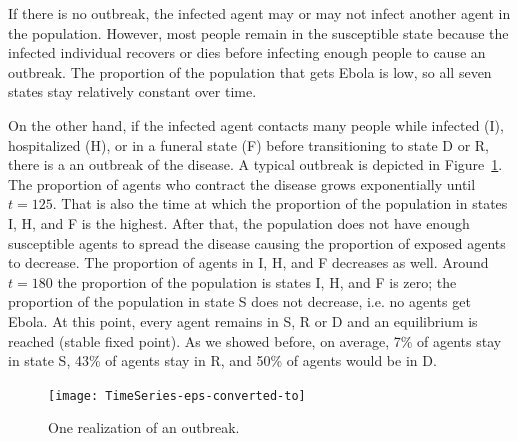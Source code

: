 
If there is no outbreak, the infected agent may or may not infect another agent in the population. However, most people remain in the  susceptible state because the infected individual recovers or dies before infecting enough people to cause an outbreak. The proportion of the population that gets Ebola is low, so all seven states stay relatively constant over time. %


On the other hand, if the infected agent contacts many people while infected (I), hospitalized (H), or in a funeral state (F) before transitioning to state D or R, there is a an outbreak of the disease. A typical outbreak is depicted in Figure~\ref{fig:Outbreak}. The proportion of agents who contract the disease grows exponentially until $t = 125$. That is also the time at which the proportion of the population in states I, H, and F is the highest. After that, the population does not have enough susceptible agents to spread the disease causing the proportion of exposed agents to decrease. The proportion of agents in I, H, and F decreases as well. Around $t = 180$ the proportion of the population is states I, H, and F is zero; the proportion of the population in state S does not decrease, i.e. no agents get Ebola. At this point, every agent remains in S, R or D and an equilibrium is reached (stable fixed point). As we showed before, on average, 7\% of agents stay in state S, 43\% of agents stay in R, and 50\% of agents would be in D. %
\begin{figure}[h!]
\begin{center}
\texttt{[image: TimeSeries-eps-converted-to]}
\end{center}
\caption{One realization of an outbreak.}
\label{fig:Outbreak}
\end{figure}

